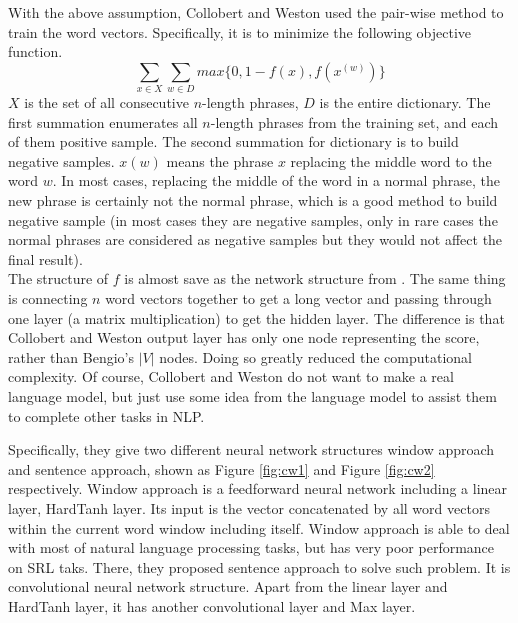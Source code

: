 With the above assumption, Collobert and Weston used the pair-wise method to train the word vectors. Specifically, it is to minimize the following objective function.
$$\sum_{x\in X}\sum_{w\in D}max\{0,1-f(x),f(x^{(w)})\}$$
$X$ is the set of all consecutive $n$-length phrases, $D$ is the entire dictionary. The first summation enumerates all $n$-length phrases from the training set, and each of them positive sample. The second summation for dictionary is to build negative samples. $x(w)$ means the phrase $x$ replacing the middle word to the word $w$. In most cases, replacing the middle of the word in a normal phrase, the new phrase is certainly not the normal phrase, which is a good method to build negative sample (in most cases they are negative samples, only in rare cases the normal phrases are considered as negative samples but they would not affect the final result). \\

The structure of $f$ is almost save as the network structure from \citep{BengioDucharmeEtAl2003}. The same thing is connecting $n$ word vectors together to get a long vector and passing through one layer (a matrix multiplication) to get the hidden layer. The difference is that Collobert and Weston output layer has only one node representing the score, rather than Bengio's $|V|$ nodes. Doing so greatly reduced the computational complexity. Of course, Collobert and Weston do not want to make a real language model, but just use some idea from the language model to assist them to complete other tasks in NLP. 

Specifically, they give two different neural network structures window approach and sentence approach, shown as Figure \ref{fig:cw1} and Figure \ref{fig:cw2} respectively. Window approach is a feedforward neural network including a linear layer, HardTanh layer. Its input is  the vector concatenated by  all word vectors within the current word window including itself. Window approach is able to deal with most of natural language processing tasks, but has very poor performance on SRL taks. There, they proposed sentence approach to solve such problem. It is convolutional neural network structure. Apart from the linear layer and HardTanh layer, it has another convolutional layer and Max layer. 

